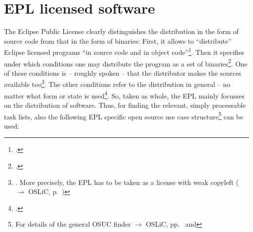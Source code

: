 %
%
%
%
%



\section{EPL licensed software}

The Eclipse Public License clearly distinguishes the distribution in the form of
source code from that in the form of binaries: First, it allows to
\enquote{distribute} Eclipse licensed programs \enquote{in source code and in
object code}\footcite[cf.][\nopage wp\ §3]{Epl10OsiLicense2005a}. Then it
specifies under which conditions one may distribute the program as a set of
binaries\footcite[cf.][\nopage wp\ §3 top area]{Epl10OsiLicense2005a}. One of
these conditions is -- roughly spoken -- that the distributor makes the sources
available too\footnote{\cite[cf.][\nopage wp\ §3 mid
area]{Epl10OsiLicense2005a}. More precisely, the EPL has to be taken as a
license with weak copyleft ($\rightarrow$ OSLiC, p.\
\pageref{sec:ProtectingPowerOfEpl})}. The other conditions refer to the
distribution in general -- no matter what form or state is
used\footcite[cf.][\nopage wp\ §3 bottom area]{Epl10OsiLicense2005a}. So, taken
as whole, the EPL mainly focusses on the distribution of software. Thus, for
finding the relevant, simply processable task lists, also the following EPL
specific open source use case structure\footnote{For details of the general OSUC
finder $\rightarrow$ OSLiC, pp.\ \pageref{OsucTokens} and
\pageref{OsucDefinitionTree}} can be used:
 
